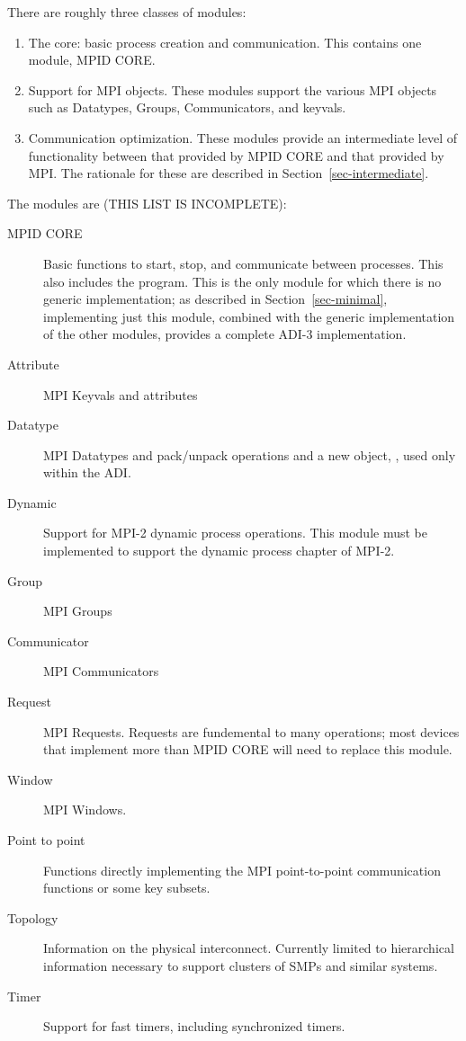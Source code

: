 \documentclass{article}
\begin{document}
There are roughly three classes of modules:
\begin{enumerate}
\item The core: basic process creation and communication. This
contains one module, MPID CORE. 
\item Support for MPI objects.  These modules support the various MPI
objects such as Datatypes, Groups, Communicators, and keyvals.
\item Communication optimization.  These modules provide an
intermediate level of functionality between that provided by MPID CORE
and that provided by MPI.  The rationale for these are described in
Section~\ref{sec-intermediate}. 
\end{enumerate}

The modules are (THIS LIST IS INCOMPLETE):
\begin{description}
\item[MPID CORE]Basic functions to start, stop, and communicate
between processes.  This also includes the  program.
This is the only module for which there is no generic implementation; as
described in Section~\ref{sec-minimal}, implementing just this module,
combined with the generic implementation of the other modules, provides a
complete ADI-3 implementation.
\item[Attribute]MPI Keyvals and attributes
\item[Datatype]MPI Datatypes and pack/unpack operations and a new
object, , used only within the ADI.
\item[Dynamic]Support for MPI-2 dynamic process operations.  This
module must be implemented to support the dynamic process chapter of MPI-2.
\item[Group]MPI Groups
\item[Communicator]MPI Communicators
\item[Request]MPI Requests.  Requests are fundemental to many
operations; most devices that implement more than MPID CORE will need
to replace this module.
\item[Window]MPI Windows.
\item[Point to point]Functions directly implementing the MPI
point-to-point communication functions or some key subsets.
\item[Topology]Information on the physical interconnect.  Currently
limited to hierarchical information necessary to support clusters of
SMPs and similar systems.
\item[Timer]Support for fast timers, including synchronized timers.

\end{description}
\end{document}
